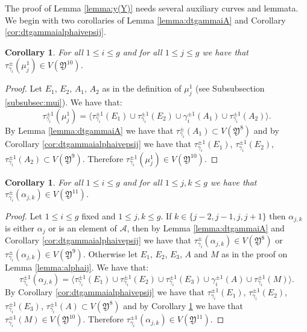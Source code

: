 \documentclass{artv3}
\newtheorem{corollary}[theorem]{Corollary}
\newcommand*{\dt}[1]{\tau_{#1}}
\newcommand{\A}{\mathcal{A}}
\newcommand*{\Y}{\mathfrak{Y}}
\begin{document}
The proof of Lemma \ref{lemma:y(Y)} needs several auxiliary curves and lemmata. We begin with two corollaries of Lemma \ref{lemma:dtgammaiA}  and Corollary \ref{cor:dtgammaialphaivepsij}.

\begin{corollary}\label{coro:dtgammaimuj1}
For all $1 \leq i \leq g$ and for all $1\leq j \leq g$ we have that $\dt{\gamma_i}^{\pm}(\mu_{j}^{1})\in V(\Y^{10})$.
\end{corollary}
\begin{proof}
Let $E_1$, $E_2$, $A_1$, $A_2$ as in the definition of $\mu_{j}^{1}$ (see Subsubsection \ref{subsubsec:mui}). We have that:
$$\dt{\gamma_{i}}^{\pm 1}(\mu_{j}^{1}) = \langle \dt{\gamma_{i}}^{\pm 1}(E_1) \cup \dt{\gamma_{i}}^{\pm 1}(E_2) \cup \gamma_{i}^{\pm 1}(A_1)\cup \dt{\gamma_{i}}^{\pm 1}(A_2) \rangle.$$
By Lemma \ref{lemma:dtgammaiA} we have that $\dt{\gamma_i}^{\pm}(A_1)\subset V(\Y^{8})$ and by Corollary \ref{cor:dtgammaialphaivepsij} we have that $\dt{\gamma_{i}}^{\pm 1}(E_1)$, $\dt{\gamma_{i}}^{\pm 1}(E_2)$, $\dt{\gamma_{i}}^{\pm 1}(A_2) \subset V(\Y^{9})$. Therefore $\dt{\gamma_{i}}^{\pm 1}(\mu_{j}^{1})\in V(\Y^{10})$.
\end{proof}

\begin{corollary}\label{coro:dtgammaialphajk}
For all $1\leq i \leq g$ and for all $1\leq j,k \leq g$ we have that $\dt{\gamma_i}^{\pm}(\alpha_{j,k})\in V(\Y^{11})$.
\end{corollary}
\begin{proof}
Let $1 \leq i \leq g$ fixed and $1\leq j,k \leq g$. If $k\in\{j-2,j-1,j,j+1 \}$ then $\alpha_{j,k}$ is either $\alpha_j$ or is an element of $\A$, then by Lemma \ref{lemma:dtgammaiA} and Corollary \ref{cor:dtgammaialphaivepsij} we have that  $\dt{\gamma_i}^{\pm}(\alpha_{j,k})\in V(\Y^{8})$ or  $\dt{\gamma_i}^{\pm}(\alpha_{j,k})\in V(\Y^{9})$. Otherwise let $E_1$, $E_2$, $E_3$, $A$ and $M$ as in the proof on  Lemma \ref{lemma:alphaij}. We have that:
$$\dt{\gamma_{i}}^{\pm 1}(\alpha_{j,k}) = \langle \dt{\gamma_{i}}^{\pm 1}(E_1) \cup \dt{\gamma_{i}}^{\pm 1}(E_2) \cup \dt{\gamma_{i}}^{\pm 1}(E_3) \cup \gamma_{i}^{\pm 1}(A)\cup \dt{\gamma_{i}}^{\pm 1}(M) \rangle.$$
By Corollary \ref{cor:dtgammaialphaivepsij} we have that $\dt{\gamma_{i}}^{\pm 1}(E_1)$, $\dt{\gamma_{i}}^{\pm 1}(E_2)$, $\dt{\gamma_{i}}^{\pm 1}(E_3)$, $\dt{\gamma_{i}}^{\pm 1}(A) \subset V(\Y^{8})$ and by Corollary \ref{coro:dtgammaimuj1} we have that $\dt{\gamma_{i}}^{\pm 1}(M)\in V(\Y^{10})$. Therefore $\dt{\gamma_{i}}^{\pm 1}(\alpha_{j,k})\in V(\Y^{11})$.
\end{proof}
\end{document}
